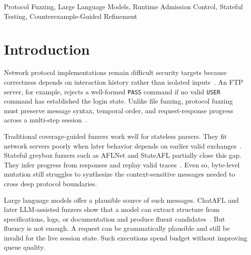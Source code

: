 \documentclass[conference]{IEEEtran}
\begin{document}
\begin{IEEEkeywords}
Protocol Fuzzing, Large Language Models, Runtime Admission Control, Stateful Testing, Counterexample-Guided Refinement
\end{IEEEkeywords}

\section{Introduction}
Network protocol implementations remain difficult security targets because correctness depends on interaction history rather than isolated inputs~\cite{aflnet,stateafl,sgf_usenix22,formatted_stateful_greybox_fuzzing_2024,resolverfuzz_query_response_2024}. An FTP server, for example, rejects a well-formed \texttt{PASS} command if no valid \texttt{USER} command has established the login state. Unlike file fuzzing, protocol fuzzing must preserve message syntax, temporal order, and request-response progress across a multi-step session~\cite{resolverfuzz_query_response_2024,mbfuzzer_mqtt_2025,bleem_packet_sequence_2023,logos_log_guided_fuzzing_2024,diane_identifying_fuzzing_triggers_2021,corecrisis_context_aware_2025}.

Traditional coverage-guided fuzzers work well for stateless parsers. They fit network servers poorly when later behavior depends on earlier valid exchanges~\cite{directed_greybox_fuzzing_2017,seed_selection_successful_fuzzing_2021,one_fuzzing_strategy_rule_2022,regression_greybox_fuzzing_2021,efficient_errors_2022}. Stateful greybox fuzzers such as AFLNet and StateAFL partially close this gap. They infer progress from responses and replay valid traces~\cite{aflnet,stateafl,sgf_usenix22,profuzzbench_benchmark_stateful_protocol_2021,snapfuzz_high_throughput_fuzzing_2022,bleem_packet_sequence_2023,formatted_stateful_greybox_fuzzing_2024}. Even so, byte-level mutation still struggles to synthesize the context-sensitive messages needed to cross deep protocol boundaries.

Large language models offer a plausible source of such messages. ChatAFL and later LLM-assisted fuzzers show that a model can extract structure from specifications, logs, or documentation and produce fluent candidates~\cite{chatafl,fuzz4all_universal_fuzzing_large_2024,llmif_augmented_large_language_2024,matter_llm_specification_2024,carpetfuzz_documentation_2023,prompt_fuzzing_fuzz_driver_2024,large_language_models_are_2023,large_language_models_are_2024}. But fluency is not enough. A request can be grammatically plausible and still be invalid for the live session state. Such executions spend budget without improving queue quality.
\end{document}
